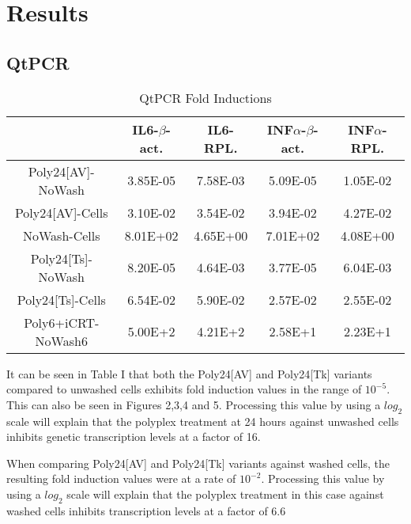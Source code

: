 \documentclass[journal, a4paper]{IEEEtran}
\begin{document}
\section{Results}

  \subsection{QtPCR}

    \begin{table}[!hbt]
      \begin{center}
      \caption{QtPCR Fold Inductions}
      \label{tab:simParameters}
      \begin{tabular}{|c|c|c|c|c|}
        \hline
        & IL6-$\beta$-act. & IL6-RPL. & INF$\alpha$-$\beta$-act. & INF$\alpha$-RPL. \\
        \hline
        Poly24[AV]-NoWash & 3.85E-05 & 7.58E-03 & 5.09E-05 & 1.05E-02 \\
        \hline
        Poly24[AV]-Cells & 3.10E-02 & 3.54E-02 & 3.94E-02 & 4.27E-02 \\
        \hline
        NoWash-Cells & 8.01E+02 & 4.65E+00 & 7.01E+02 & 4.08E+00 \\
        \hline
        Poly24[Ts]-NoWash & 8.20E-05 & 4.64E-03 & 3.77E-05 & 6.04E-03\\
        \hline
        Poly24[Ts]-Cells & 6.54E-02 & 5.90E-02 & 2.57E-02 & 2.55E-02\\
        \hline
        Poly6+iCRT-NoWash6 & 5.00E+2 & 4.21E+2 & 2.58E+1 & 2.23E+1 \\
        \hline
      \end{tabular}
      \end{center}
    \end{table}


    It can be seen in Table I that both the Poly24[AV] and Poly24[Tk] variants compared to unwashed cells
    exhibits fold induction values in the range of $10^{-5}$. This can also be seen in Figures 2,3,4 and 5.
    Processing this value by using a $log_2$ scale will explain that the polyplex treatment at 24 hours
    against unwashed cells inhibits genetic transcription levels at a factor of 16.

    When comparing Poly24[AV] and Poly24[Tk] variants against washed cells,
    the resulting fold induction values were at a rate of $10^{-2}$. Processing this value
    by using a $log_2$ scale will explain that the polyplex treatment
    in this case against washed cells inhibits transcription levels at a factor of 6.6
\end{document}
